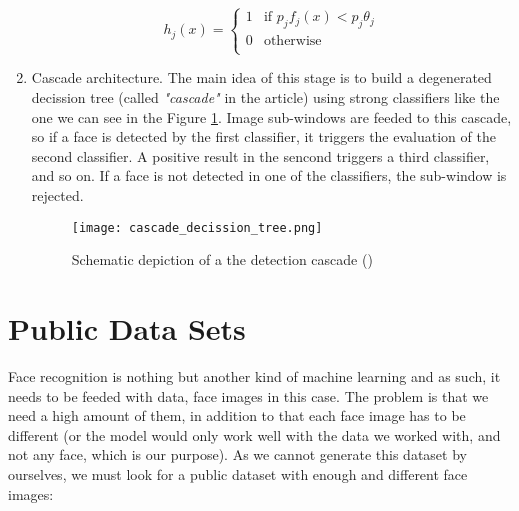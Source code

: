 \begin{enumerate}
		\begin{equation}
			\label{eq:viola_jones_weak_classifier}
			h_j(x)=
				\begin{cases}
			     	1 & \text{if $p_jf_j(x) < p_j\theta_j$} \\
			        0 & \text{otherwise} \\
				\end{cases}
		\end{equation}

		\item Cascade architecture. The main idea of this stage is to build a degenerated decission tree (called \textit{"cascade"} in the article) using strong classifiers like the one we can see in the Figure \ref{fig:cascade_decission_tree}. Image sub-windows are feeded to this cascade, so if a face is detected by the first classifier, it triggers the evaluation of the second classifier. A positive result in the sencond triggers a third classifier, and so on. If a face is not detected in one of the classifiers, the sub-window is rejected. 
		
		\begin{figure}[h!b]
			\centering
			\texttt{[image: cascade\_decission\_tree.png]}
			\caption{Schematic depiction of a the detection cascade (\cite{viola2001rapid})}
			\label{fig:cascade_decission_tree}
		\end{figure}
			
	\end{enumerate}

\section{Public Data Sets} 
Face recognition is nothing but another kind of machine learning and as such, it needs to be feeded with data, face images in this case. The problem is that we need a high amount of them, in addition to that each face image has to be different (or the model would only work well with the data we worked with, and not any face, which is our purpose). As we cannot generate this dataset by ourselves, we must look for a public dataset with enough and different face images:

